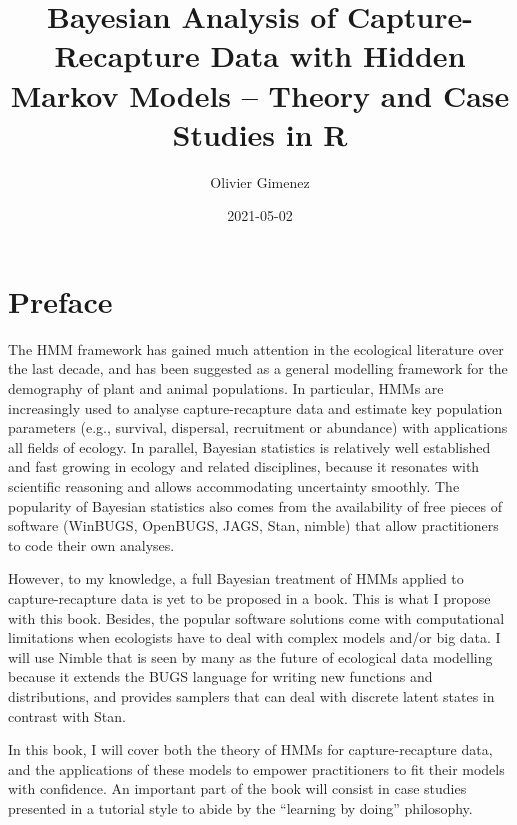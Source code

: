\documentclass[
  12pt,
]{krantz}
\title{Bayesian Analysis of Capture-Recapture Data with Hidden Markov Models -- Theory and Case Studies in R}
\author{Olivier Gimenez}
\date{2021-05-02}
\begin{document}
\maketitle

\thispagestyle{empty}

\setlength{\abovedisplayskip}{-5pt}
\setlength{\abovedisplayshortskip}{-5pt}

{
\hypersetup{linkcolor=}
\setcounter{tocdepth}{2}
\tableofcontents
}
\listoftables
\listoffigures
\hypertarget{preface}{%
\chapter*{Preface}\label{preface}}


The HMM framework has gained much attention in the ecological literature over the last decade, and has been suggested as a general modelling framework for the demography of plant and animal populations. In particular, HMMs are increasingly used to analyse capture-recapture data and estimate key population parameters (e.g., survival, dispersal, recruitment or abundance) with applications all fields of ecology. In parallel, Bayesian statistics is relatively well established and fast growing in ecology and related disciplines, because it resonates with scientific reasoning and allows accommodating uncertainty smoothly. The popularity of Bayesian statistics also comes from the availability of free pieces of software (WinBUGS, OpenBUGS, JAGS, Stan, nimble) that allow practitioners to code their own analyses.

However, to my knowledge, a full Bayesian treatment of HMMs applied to capture-recapture data is yet to be proposed in a book. This is what I propose with this book. Besides, the popular software solutions come with computational limitations when ecologists have to deal with complex models and/or big data. I will use Nimble that is seen by many as the future of ecological data modelling because it extends the BUGS language for writing new functions and distributions, and provides samplers that can deal with discrete latent states in contrast with Stan.

In this book, I will cover both the theory of HMMs for capture-recapture data, and the applications of these models to empower practitioners to fit their models with confidence. An important part of the book will consist in case studies presented in a tutorial style to abide by the ``learning by doing'' philosophy.
\end{document}
